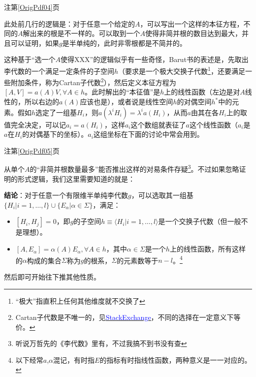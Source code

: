 \documentclass{beamer}
\newcommand{\pdfpage}[1]{{\usebackgroundtemplate{\texttt{[image: W4/W4\_页面\_\#1.jpg]}}\begin{frame}[plain]\label{OrigPdf#1}\end{frame}}}%
\newcommand{\refpage}[1]{注第\ref{OrigPdf#1}页}%
\begin{document}
\begin{frame}{\refpage{04}}
	
	此处前几行的逻辑是：对于任意一个给定的$A$，可以写出一个这样的本征方程，不同的$A$解出来的根是不一样的。可以取到一个$A$使得非简并根的数目达到最大，并且可以证明，如果$g$是半单纯的，此时非零根都是不简并的。
	
	这种基于“选一个$A$使得XXX”的逻辑似乎有一些奇怪，Barut书的表述是，先取出李代数的一个满足一定条件的子空间$h$（要求是一个极大交换子代数\footnote{“极大”指直积上任何其他维度就不交换了}，还要满足一些附加条件，称为Cartan子代数\footnote{Cartan子代数是不唯一的，见\href{https://math.stackexchange.com/questions/134901/is-cartan-subalgebra-of-a-lie-algebra-unique}{\underline{\textcolor{blue}{StackExchange}}}，不同的选择在一定意义下等价。}），然后定义本征方程为$[A,V]=a(A)V,\forall A\in h$。此时解出的“本征值”是$h$上的线性函数（左边是对$A$线性的，所以右边的$a(A)$应该也是），或者说是线性空间$h$的对偶空间$h^*$中的元素。假如$h$选定了一组基$H_i$，则$a(\lambda^iH_i)=\lambda^ia(H_i)$，从而$a$由其在各$H_i$上的取值完全决定，可以记$a_i=a(H_i)$，这样$a_i$这个数组就表征了$a$这个线性函数（$a_i$是$a$在$H_i$的对偶基下的坐标）。$a_i$这组坐标在下面的讨论中常会用到。
	
\end{frame}

\pdfpage{05}

\begin{frame}{\refpage{05}}
	
	从单个$A$的“非简并根数量最多”能否推出这样的对易条件存疑\footnote{听说万哲先的《李代数》里有，不过我搞不到书没有查}。不过如果忽略证明的形式逻辑，我们这里需要知道的就是：
	
	\textbf{结论}：对于任意一个有限维半单纯李代数$g$，可以选取其一组基$\{H_i|i=1,\dots,l\}\cup\{E_\alpha|\alpha\in\Sigma\}$，满足：
	\begin{itemize}
		\item $[H_i,H_j]=0$，即$g$的子空间$h\equiv\langle H_i|i=1,\dots,l\rangle$是一个交换子代数（但一般不是理想）。
		\item $[A,E_\alpha]=\alpha(A)E_\alpha,\forall A\in h$，其中$\alpha\in\Sigma$是一个$h$上的线性函数，所有这样的$\alpha$构成的集合$\Sigma$称为$g$的根系，$\Sigma$的元素数等于$n-l$。\footnote{以下经常$a$,$\alpha$混记，有时指$E$的指标有时指线性函数，两种意义是一一对应的。}
	\end{itemize}
	
	然后即可开始往下推其他性质。
	
\end{frame}
\end{document}
